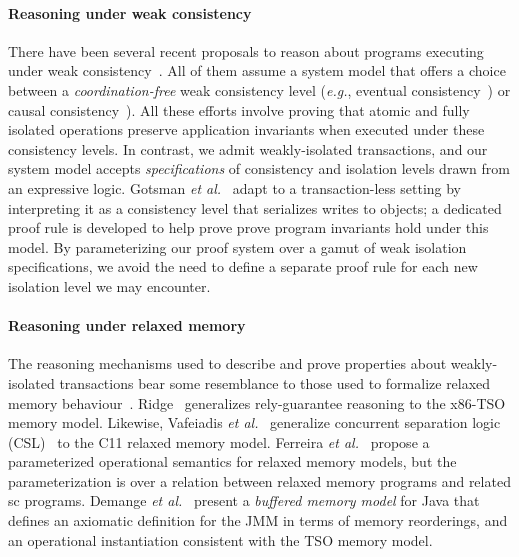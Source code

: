 \vspace*{-4pt}
\paragraph{Reasoning under weak consistency} There have been several
recent proposals to reason about programs executing under weak
consistency~\cite{bailisvldb, alvarocalm, gotsmanpopl16,redblueatc,
  redblueosdi, ecinec}. All of them assume a system model that offers
a choice between a \emph{coordination-free} weak consistency level
(\emph{e.g.}, eventual consistency~\cite{redblueosdi, redblueatc,
  ecinec, alvarocalm, bailisvldb}) or causal
consistency~\cite{lbc16,gotsmanpopl16}). All these efforts involve
proving that atomic and fully isolated operations preserve application
invariants when executed under these consistency levels.  In contrast,
we admit weakly-isolated transactions, and our system model accepts
\emph{specifications} of consistency and isolation levels drawn from
an expressive logic.  Gotsman \emph{et al.}~\cite{gotsmanpopl16}
adapt  to a transaction-less setting
by interpreting it as a consistency level that serializes writes to
objects; a dedicated proof rule is developed to help prove prove
program invariants hold under this model. By parameterizing our proof
system over a gamut of weak isolation specifications, we avoid the
need to define a separate proof rule for each new isolation level we
may encounter.

\vspace*{-4pt}
\paragraph{Reasoning under relaxed memory} The reasoning mechanisms
used to describe and prove properties about weakly-isolated
transactions bear some resemblance to those used to formalize relaxed
memory behaviour~\cite{battycpp}.  Ridge~\cite{rgtso} generalizes
rely-guarantee reasoning to the x86-TSO memory model.  Likewise,
Vafeiadis \emph{et al.}~\cite{rsl13} generalize concurrent separation
logic (CSL)~\cite{csl} to the C11 relaxed memory model.  Ferreira
\emph{et al.}~\cite{ferreira10} propose a parameterized operational
semantics for relaxed memory models, but the parameterization is over
a relation between relaxed memory programs and related {\sc sc}
programs. Demange \emph{et al.}~\cite{DLZ+13} present a \emph{buffered
  memory model} for Java that defines an axiomatic definition for the
JMM in terms of memory reorderings, and an operational instantiation
consistent with the TSO memory model.


